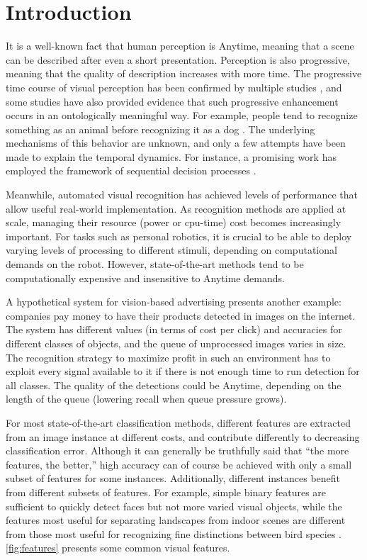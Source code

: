 \chapter{Introduction}\label{sec:introduction}

It is a well-known fact that human perception is Anytime, meaning that a scene can be described after even a short presentation.
Perception is also progressive, meaning that the quality of description increases with more time.
The progressive time course of visual perception has been confirmed by multiple studies \parencite{Vanrullen-1996,Fei-Fei-Vision-2007}, and some studies have also provided evidence that such progressive enhancement occurs in an ontologically meaningful way.
For example, people tend to recognize something as an animal before recognizing it as a dog \parencite{Mace-PloS-2009}.
The underlying mechanisms of this behavior are unknown, and only a few attempts have been made to explain the temporal dynamics.
For instance, a promising work has employed the framework of sequential decision processes \parencite{Hegde-Neuro-2008}.

Meanwhile, automated visual recognition has achieved levels of performance that allow useful real-world implementation.
As recognition methods are applied at scale, managing their resource (power or cpu-time) cost becomes increasingly important.
For tasks such as personal robotics, it is crucial to be able to deploy varying levels of processing to different stimuli, depending on computational demands on the robot.
However, state-of-the-art methods tend to be computationally expensive and insensitive to Anytime demands.

A hypothetical system for vision-based advertising presents another example: companies pay money to have their products detected in images on the internet.
The system has different values (in terms of cost per click) and accuracies for different classes of objects, and the queue of unprocessed images varies in size.
The recognition strategy to maximize profit in such an environment has to exploit every signal available to it if there is not enough time to run detection for all classes.
The quality of the detections could be Anytime, depending on the length of the queue (lowering recall when queue pressure grows).

For most state-of-the-art classification methods, different features are extracted from an image instance at different costs, and contribute differently to decreasing classification error.
Although it can generally be truthfully said that ``the more features, the better,'' high accuracy can of course be achieved with only a small subset of features for some instances.
Additionally, different instances benefit from different subsets of features.
For example, simple binary features are sufficient to quickly detect faces \parencite{Viola-IJCV-2004} but not more varied visual objects, while the features most useful for separating landscapes from indoor scenes \parencite{Xiao-CVPR-2010} are different from those most useful for recognizing fine distinctions between bird species \parencite{Farrell-ICCV-2011}.
\autoref{fig:features} presents some common visual features.

